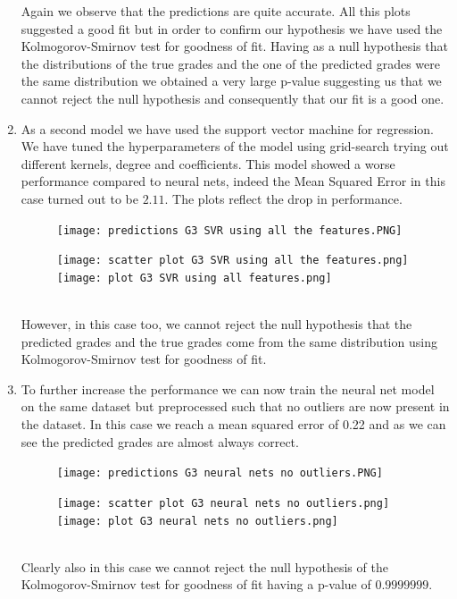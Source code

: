 \documentclass[a4paper, 11pt]{report}
\theoremstyle{definition}
\numberwithin{equation}{section}		%
\numberwithin{table}{section}				%
\begin{document}
\begin{enumerate}
Again we observe that the predictions are quite accurate.
All this plots suggested a good fit but in order to confirm our hypothesis we have used the Kolmogorov-Smirnov test for goodness of fit. Having as a null hypothesis that the distributions of the true grades and the one of the predicted grades were the same distribution we obtained a very large p-value suggesting us that we cannot reject the null hypothesis and consequently that our fit is a good one.
\item As a second model we have used the support vector machine for regression. We have tuned the hyperparameters of the model using grid-search trying out different kernels, degree and coefficients. This model showed a worse performance compared to neural nets, indeed the Mean Squared Error in this case turned out to be $2.11$. The plots reflect the drop in performance.
\newline
\begin{figure}[h]\centering
\texttt{[image: predictions G3 SVR using all the features.PNG]}
\end{figure}
\begin{figure}[h]\centering
\texttt{[image: scatter plot G3 SVR using all the features.png]}
\texttt{[image: plot G3 SVR using all features.png]}
\end{figure}\\
However, in this case too, we cannot reject the null hypothesis that the predicted grades and the true grades come from the same distribution using Kolmogorov-Smirnov test for goodness of fit.
\newline
\item To further increase the performance we can now train the neural net model on the same dataset but preprocessed such that no outliers are now present in the dataset. In this case we reach a mean squared error of 0.22 and as we can see the predicted grades are almost always correct.\\
\newline
\begin{figure}[h]\centering
\texttt{[image: predictions G3 neural nets no outliers.PNG]}
\end{figure}
\begin{figure}[h]\centering
\texttt{[image: scatter plot G3 neural nets no outliers.png]}
\texttt{[image: plot G3 neural nets no outliers.png]}
\end{figure}\\
Clearly also in this case we cannot reject the null hypothesis of the Kolmogorov-Smirnov test for goodness of fit having a p-value of $0.9999999$.

\end{enumerate}
\end{document}
